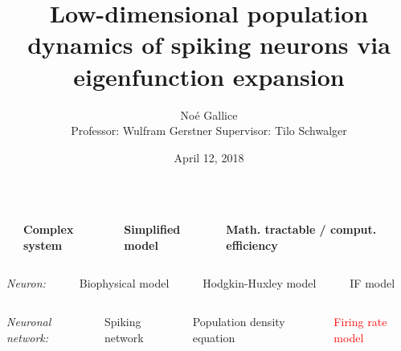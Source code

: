 \documentclass{beamer}
\title[Short title]{Low-dimensional population dynamics of spiking neurons via eigenfunction expansion}
\author{No\'e Gallice \\ \medskip Professor: Wulfram Gerstner \hspace{0.5cm}  Supervisor: Tilo Schwalger} %
\institute[EPFL] %
{ Laboratory of Computational Neuroscience, EPFL \\ %
\medskip %
}
\date{April 12, 2018}
\begin{document}
\begin{frame}
	\titlepage %
\end{frame}


\begin{frame}

\small{
	\begin{columns}
	\begin{column}{.12\textwidth}

		
	\end{column}
	\begin{column}{.28\textwidth}
			\centering
		\textbf{Complex system } 
		
	\end{column}
	\begin{column}{.3\textwidth}
			\centering
\textbf{Simplified model} 
	
\end{column}
	\begin{column}{.3\textwidth}
			\centering
		\textbf{Math. tractable / comput. efficiency}
	\end{column}
\end{columns}

\vspace{0.5cm}

\begin{columns}
	\begin{column}{.15\textwidth}
		\textit{Neuron:}
		
	\end{column}
	\begin{column}{.25\textwidth}
	\centering
	Biophysical model 	
	\end{column}
	\begin{column}{.3\textwidth}
	\centering
	Hodgkin-Huxley model 
	\end{column}
	\begin{column}{.3\textwidth}
	\centering
	IF model
	\end{column}
\end{columns}

\pause
\vspace{0.5cm}
\begin{columns}
	\begin{column}{.15\textwidth}
		\textit{Neuronal network:} 
		
	\end{column}
	\begin{column}{.25\textwidth}
		\centering
	Spiking network
	\end{column}
	\begin{column}{.3\textwidth}
		\centering
	  Population density equation
	\end{column}
	\begin{column}{.3\textwidth}
		\centering
		\textcolor{red}{Firing rate model}
	\end{column}
\end{columns}
}


\end{frame}
\end{document}
